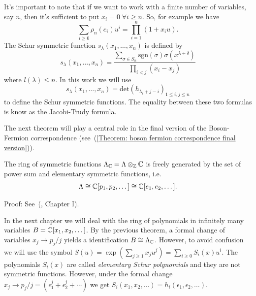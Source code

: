 It's important to note that if we want to work with a finite number of variables, say $n$, then it's sufficient to put $x_i=0\;\forall i\geq n$. So, for example we have
\begin{equation}
    \sum_{i\geq0}\rho_n(e_i)u^i=\prod_{i=1}^n(1+x_iu).
\end{equation}
 The Schur symmetric function $s_\lambda(x_1,\dots,x_n)$ is defined by
 \begin{equation}
     s_\lambda(x_1,\dots,x_n)=\frac{\sum_{\sigma\in S_n}\text{sgn}(\sigma)\sigma(x^{\lambda+\delta})}{\prod_{i<j}(x_i-x_j)}
 \end{equation}
where $l(\lambda)\leq n$. In this work we will use 
\begin{equation}\label{Equation: jacobi-Trudy for Schur}
    s_\lambda(x_1,\dots,x_n)=\text{det}(h_{\lambda_i+j-i})_{1\leq i,j\leq n}
\end{equation}
to define the Schur symmetric functions. The equality between these two formulas is know as the Jacobi-Trudy formula.\par
The next theorem will play a central role in the final version of the Boson-Fermion correspondence (see~(\ref{Theorem: boson fermion correspondence final version})).
\begin{dang}
    \begin{theorem}\label{Theorem: the ring of symmetric functions is freely generated by the power sum}
        The ring of symmetric functions $\Lambda_{\mathbb{C}}=\Lambda\otimes_{\mathbb{Z}}\mathbb{C}$ is freely generated by the set of power sum and elementary symmetric functions, i.e.
        \begin{equation}
            \Lambda \cong \mathbb{C}[p_1,p_2,\dots]\cong\mathbb{C}[e_1,e_2,\dots].
        \end{equation}
    \end{theorem}
\end{dang}
Proof: See~(\cite{macdonald1998symmetric}, Chapter I).

\begin{dang}
    \begin{remark}\label{Remark: identification between the bosonic fock space and the ring of symmetric functions}
        In the next chapter we will deal with the ring of polynomials in infinitely many variables $B=\mathbb{C}[x_1,x_2,\dots]$. By the previous theorem, a formal change of variables $x_j\to p_j/j$ yields a identification $B\cong\Lambda_{\mathbb{C}}$. However, to avoid confusion we will use the symbol $S(u)=\exp(\sum_{j\geq1}x_ju^{j})=\sum_{i\geq0}S_i(x)u^i$. The polynomials $S_i(x)$ are called \textit{elementary Schur polynomials} and they are not symmetric functions. However, under the formal change $x_j\to p_j/j=(\epsilon_1^j+\epsilon_2^j+\cdots)$ we get $S_i(x_1,x_2,\dots)=h_i(\epsilon_1,\epsilon_2,\dots)$.
    \end{remark}
\end{dang}





